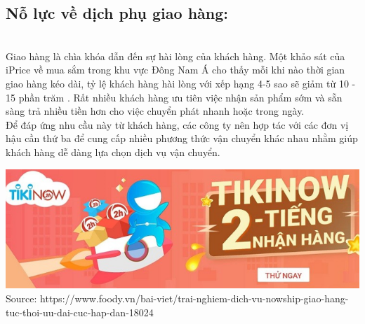 \documentclass[13pt,a4paper]{article}
\begin{document}
    \subsection{Nỗ lực về dịch phụ giao hàng:}\\
    Giao hàng là chìa khóa dẫn đến sự hài lòng của khách hàng. Một khảo sát của iPrice về mua sắm trong khu vực Đông Nam Á cho thấy mỗi khi nào thời gian giao hàng kéo dài, tỷ lệ khách hàng hài lòng với xếp hạng 4-5 sao sẽ giảm từ 10 - 15 phần trăm . Rất nhiều khách hàng ưu tiên việc nhận sản phẩm sớm và sẵn sàng trả nhiều tiền hơn cho việc chuyển phát nhanh hoặc trong ngày.\\
    Để đáp ứng nhu cầu này từ khách hàng, các công ty nên hợp tác với các đơn vị hậu cần thứ ba để cung cấp nhiều phương thức vận chuyển khác nhau nhằm giúp khách hàng dễ dàng lựa chọn dịch vụ vận chuyển.
    \begin{center}
    \includegraphics[scale=0.6]{images/giaohang.png} \\
    \fontsize{10pt}{1.2pt}\selectfont
    Source: https://www.foody.vn/bai-viet/trai-nghiem-dich-vu-nowship-giao-hang-tuc-thoi-uu-dai-cuc-hap-dan-18024
    \end{center}
\end{document}
